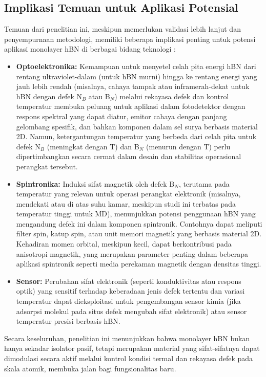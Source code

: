 \subsection{Implikasi Temuan untuk Aplikasi Potensial}
\label{subsec:implikasi_aplikasi}
Temuan dari penelitian ini, meskipun memerlukan validasi lebih lanjut dan penyempurnaan metodologi, memiliki beberapa implikasi penting untuk potensi aplikasi monolayer hBN di berbagai bidang teknologi \cite{[1, 1]}:
\begin{itemize}
    \item \textbf{Optoelektronika:} Kemampuan untuk menyetel celah pita energi hBN dari rentang ultraviolet-dalam (untuk hBN murni) hingga ke rentang energi yang jauh lebih rendah (misalnya, cahaya tampak atau inframerah-dekat untuk hBN dengan defek N$_B$ atau B$_N$) melalui rekayasa defek dan kontrol temperatur membuka peluang untuk aplikasi dalam fotodetektor dengan respons spektral yang dapat diatur, emitor cahaya dengan panjang gelombang spesifik, dan bahkan komponen dalam sel surya berbasis material 2D. Namun, ketergantungan temperatur yang berbeda dari celah pita untuk defek N$_B$ (meningkat dengan T) dan B$_N$ (menurun dengan T) perlu dipertimbangkan secara cermat dalam desain dan stabilitas operasional perangkat tersebut.
    \item \textbf{Spintronika:} Induksi sifat magnetik oleh defek B$_N$, terutama pada temperatur yang relevan untuk operasi perangkat elektronik (misalnya, mendekati atau di atas suhu kamar, meskipun studi ini terbatas pada temperatur tinggi untuk MD), menunjukkan potensi penggunaan hBN yang mengandung defek ini dalam komponen spintronik. Contohnya dapat meliputi filter spin, katup spin, atau unit memori magnetik yang berbasis material 2D. Kehadiran momen orbital, meskipun kecil, dapat berkontribusi pada anisotropi magnetik, yang merupakan parameter penting dalam beberapa aplikasi spintronik seperti media perekaman magnetik dengan densitas tinggi.
    \item \textbf{Sensor:} Perubahan sifat elektronik (seperti konduktivitas atau respons optik) yang sensitif terhadap keberadaan jenis defek tertentu dan variasi temperatur dapat dieksploitasi untuk pengembangan sensor kimia (jika adsorpsi molekul pada situs defek mengubah sifat elektronik) atau sensor temperatur presisi berbasis hBN.
\end{itemize}
Secara keseluruhan, penelitian ini menunjukkan bahwa monolayer hBN bukan hanya sekadar isolator pasif, tetapi merupakan material yang sifat-sifatnya dapat dimodulasi secara aktif melalui kontrol kondisi termal dan rekayasa defek pada skala atomik, membuka jalan bagi fungsionalitas baru.

